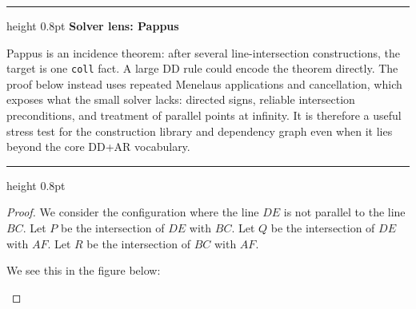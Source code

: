 \documentclass[reqno]{amsart}
\newenvironment{lecturebox}[1]{%
    \par\medskip
    \noindent\begingroup
    \setlength{\parindent}{0pt}
    \color{agblue}\hrule height 0.8pt\color{black}
    \smallskip
    \textbf{\color{agblue}#1}\par\smallskip
}{%
    \smallskip
    \color{agblue}\hrule height 0.8pt\color{black}
    \endgroup
    \medskip
}
\DeclareMathOperator{\1}{\textbf{1}}
\begin{document}
\begin{lecturebox}{Solver lens: Pappus}
Pappus is an incidence theorem: after several line-intersection constructions,
the target is one \verb|coll| fact. A large DD rule could encode the theorem
directly. The proof below instead uses repeated Menelaus applications and
cancellation, which exposes what the small solver lacks: directed signs,
reliable intersection preconditions, and treatment of parallel points at
infinity. It is therefore a useful stress test for the construction library
and dependency graph even when it lies beyond the core DD+AR vocabulary.
\end{lecturebox}

\begin{proof}
    We consider the configuration where the line $DE$ is not parallel to the line $BC$. 
Let $P$ be the intersection of $DE$ with $BC$. 
Let $Q$ be the intersection of $DE$ with $AF$. 
Let $R$ be the intersection of $BC$ with $AF$. 

We see this in the figure below:

\begin{figure}[h]
\end{figure}
\end{proof}
\end{document}

